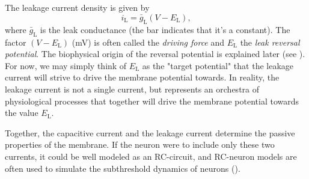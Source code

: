 \subsection{}
\label{sec:Neuron:leak}
The leakage current density is given by
\begin{equation}
i_{\mathrm{L}} = \bar{g}_{\mathrm{L}} (V - E_{\mathrm{L}}),
\label{eq:Neuron:HHleak}
\end{equation}
where $\bar{g}_{\mathrm{L}}$ is the leak conductance (the bar indicates that it's a constant). The factor $(V - E_{\mathrm{L}})$ (\si{\milli\volt}) is often called the \textit{driving force} and $E_{\mathrm{L}}$ the \textit{leak reversal potential}. The biophysical origin of the reversal potential is explained later (see ). For now, we may simply think of $E_{\mathrm{L}}$ as the "target potential" that the leakage current will strive to drive the membrane potential towards. In reality, the leakage current is not a single current, but represents an orchestra of physiological processes that together will drive the membrane potential towards the value $E_{\mathrm{L}}$. 

Together, the capacitive current and the leakage current determine the passive properties of the membrane. If the neuron were to include only these two currents, it could be well modeled as an RC-circuit, and RC-neuron models are often used to simulate the subthreshold dynamics of neurons (). 

